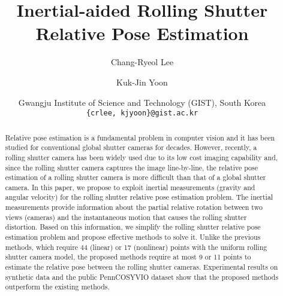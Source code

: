 \documentclass[10pt,twocolumn,letterpaper]{article}
\theoremstyle{definition}
\begin{document}
	
	\title{Inertial-aided Rolling Shutter Relative Pose Estimation}
	
	\author{Chang-Ryeol Lee\and 
		Kuk-Jin Yoon\and
		Gwangju Institute of Science and Technology (GIST), South Korea\\
		{\tt\small \{crlee, kjyoon\}@gist.ac.kr}
	} 
	
	\maketitle
	
	\begin{abstract}
		Relative pose estimation is a fundamental problem in computer vision and it has been studied for conventional global shutter cameras for decades.  
		However, recently, a rolling shutter camera has been widely used due to its low cost imaging capability and, since the rolling shutter camera captures the image line-by-line, the relative pose estimation of a rolling shutter camera is more difficult than that of a global shutter camera. 
		In this paper, we propose to exploit inertial measurements (gravity and angular velocity) for the rolling shutter relative pose estimation problem.
		The inertial measurements provide information about the partial relative rotation between two views (cameras) and the instantaneous motion that causes the rolling shutter distortion. 
		Based on this information, we simplify the rolling shutter relative pose estimation problem and propose effective methods to solve it.
		Unlike the previous methods, which require 44 (linear) or 17 (nonlinear) points with the uniform rolling shutter camera model, the proposed methods require at most 9 or 11 points to estimate the relative pose between the rolling shutter cameras.
		Experimental results on synthetic data and the public PennCOSYVIO dataset show that the proposed methods outperform the existing methods.
	\end{abstract}
	
\end{document}
